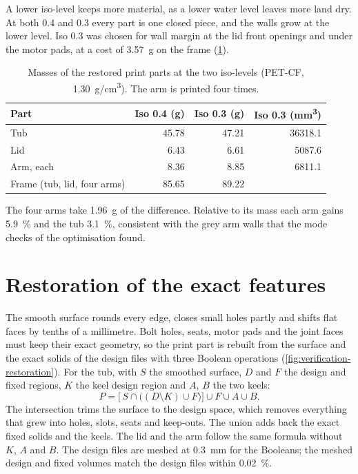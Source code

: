 A lower iso-level keeps more material, as a lower water level leaves more land dry. At both 0.4 and 0.3 every part is one closed piece, and the walls grow at the lower level. Iso 0.3 was chosen for wall margin at the lid front openings and under the motor pads, at a cost of \SI{3.57}{g} on the frame (\cref{tab:verification-masses}).

\begin{table}[htbp]
\centering\small
\caption{Masses of the restored print parts at the two iso-levels (PET-CF, \SI{1.30}{g/cm^3}). The arm is printed four times.}\label{tab:verification-masses}
\begin{tabular}{@{}lrrr@{}}
\toprule
Part & Iso 0.4 (\si{g}) & Iso 0.3 (\si{g}) & Iso 0.3 (\si{mm^3})\\
\midrule
Tub & 45.78 & 47.21 & \num{36318.1}\\
Lid & 6.43 & 6.61 & \num{5087.6}\\
Arm, each & 8.36 & 8.85 & \num{6811.1}\\
\midrule
Frame (tub, lid, four arms) & 85.65 & 89.22 & \\
\bottomrule
\end{tabular}
\end{table}

The four arms take \SI{1.96}{g} of the difference. Relative to its mass each arm gains \SI{5.9}{\percent} and the tub \SI{3.1}{\percent}, consistent with the grey arm walls that the mode checks of the optimisation found.

\section{Restoration of the exact features}\label{sec:verification-restoration}

The smooth surface rounds every edge, closes small holes partly and shifts flat faces by tenths of a millimetre. Bolt holes, seats, motor pads and the joint faces must keep their exact geometry, so the print part is rebuilt from the surface and the exact solids of the design files with three Boolean operations (\cref{fig:verification-restoration}). For the tub, with $S$ the smoothed surface, $D$ and $F$ the design and fixed regions, $K$ the keel design region and $A$, $B$ the two keels:
\begin{equation}
P = \bigl[\,S \cap \bigl((D \setminus K) \cup F\bigr)\bigr] \cup F \cup A \cup B.
\end{equation}
The intersection trims the surface to the design space, which removes everything that grew into holes, slots, seats and keep-outs. The union adds back the exact fixed solids and the keels. The lid and the arm follow the same formula without $K$, $A$ and $B$. The design files are meshed at \SI{0.3}{mm} for the Booleans; the meshed design and fixed volumes match the design files within \SI{0.02}{\percent}.

